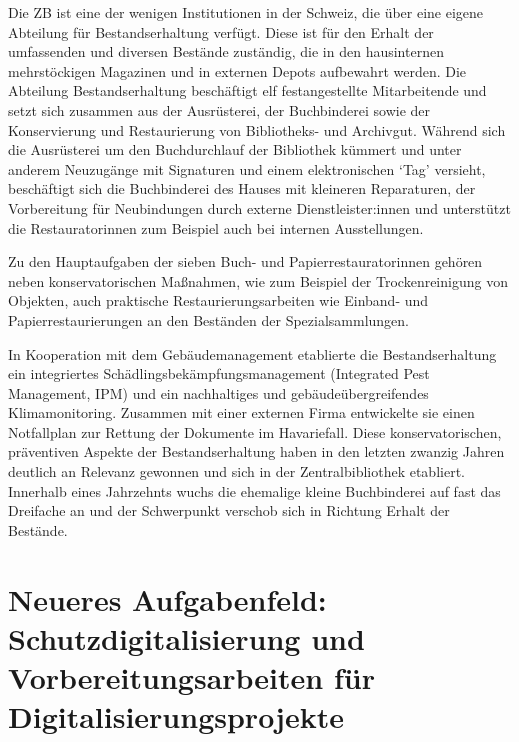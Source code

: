 \documentclass[a4paper,
fontsize=11pt,
oneside,
numbers=noperiodatend,
parskip=half-,
bibliography=totoc,
final
]{scrartcl}
\begin{document}
Die ZB ist eine der wenigen Institutionen in der Schweiz, die über eine
eigene Abteilung für Bestandserhaltung verfügt. Diese ist für den Erhalt
der umfassenden und diversen Bestände zuständig, die in den hausinternen
mehrstöckigen Magazinen und in externen Depots aufbewahrt werden. Die
Abteilung Bestandserhaltung beschäftigt elf festangestellte
Mitarbeitende und setzt sich zusammen aus der Ausrüsterei, der
Buchbinderei sowie der Konservierung und Restaurierung von Bibliotheks-
und Archivgut. Während sich die Ausrüsterei um den Buchdurchlauf der
Bibliothek kümmert und unter anderem Neuzugänge mit Signaturen und einem
elektronischen \enquote*{Tag} versieht, beschäftigt sich die
Buchbinderei des Hauses mit kleineren Reparaturen, der Vorbereitung für
Neubindungen durch externe Dienstleister:innen und unterstützt die
Restauratorinnen zum Beispiel auch bei internen Ausstellungen.

Zu den Hauptaufgaben der sieben Buch- und Papierrestauratorinnen gehören
neben konservatorischen Maßnahmen, wie zum Beispiel der Trockenreinigung
von Objekten, auch praktische Restaurierungsarbeiten wie Einband- und
Papierrestaurierungen an den Beständen der Spezialsammlungen.

In Kooperation mit dem Gebäudemanagement etablierte die
Bestandserhaltung ein integriertes Schädlingsbekämpfungsmanagement
(Integrated Pest Management, IPM) und ein nachhaltiges und
gebäudeübergreifendes Klimamonitoring. Zusammen mit einer externen Firma
entwickelte sie einen Notfallplan zur Rettung der Dokumente im
Havariefall. Diese konservatorischen, präventiven Aspekte der
Bestandserhaltung haben in den letzten zwanzig Jahren deutlich an
Relevanz gewonnen und sich in der Zentralbibliothek etabliert. Innerhalb
eines Jahrzehnts wuchs die ehemalige kleine Buchbinderei auf fast das
Dreifache an und der Schwerpunkt verschob sich in Richtung Erhalt der
Bestände.

\hypertarget{neueres-aufgabenfeld-schutzdigitalisierung-und-vorbereitungsarbeiten-fuxfcr-digitalisierungsprojekte}{%
\section{Neueres Aufgabenfeld: Schutzdigitalisierung und
Vorbereitungsarbeiten für
Digitalisierungsprojekte}\label{neueres-aufgabenfeld-schutzdigitalisierung-und-vorbereitungsarbeiten-fuxfcr-digitalisierungsprojekte}}
\end{document}
